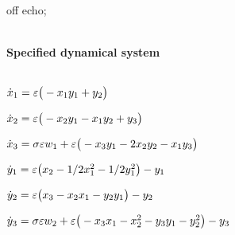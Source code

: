 
off echo;


\begin{math}
\end{math}
\paragraph{Specified dynamical system}
\begin{math}
\end{math}\par

\begin{math}
\dot x_{1}=\varepsilon \big(-x_{1} y_{1}+y_{2}\big)
\end{math}\par

\begin{math}
\dot x_{2}=\varepsilon \big(-x_{2} y_{1}-x_{1} y_{2}+y_{3}\big)
\end{math}\par

\begin{math}
\dot x_{3}=\sigma  \varepsilon w_{1}+\varepsilon \big(-x_{3} y_{1}-2 x_{2} y_{2}-x_{1}
 y_{3}\big)
\end{math}\par

\begin{math}
\dot y_{1}=\varepsilon \big(x_{2}-1/2 x_{1}^{2}-1/2 y_{1}^{2}\big)-y_{1}
\end{math}\par

\begin{math}
\dot y_{2}=\varepsilon \big(x_{3}-x_{2} x_{1}-y_{2} y_{1}\big)-y_{2}
\end{math}\par

\begin{math}
\dot y_{3}=\sigma  \varepsilon w_{2}+\varepsilon \big(-x_{3} x_{1}-x_{2}^{2}-y_{3} y_{
1}-y_{2}^{2}\big)-y_{3}
\end{math}\par
